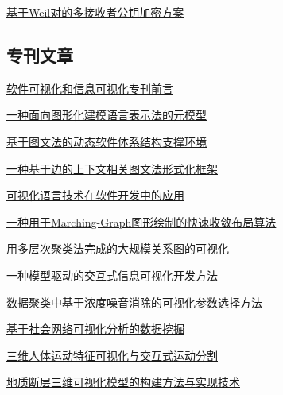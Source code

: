 \documentclass[a4paper]{article}
\begin{document}
\href{http://www.jos.org.cn/ch/reader/download_pdf.aspx?file_no=20080825&year_id=2008&quarter_id=8&falg=1}{基于Weil对的多接收者公钥加密方案}

\subsection{专刊文章}
\href{http://www.jos.org.cn/ch/reader/download_pdf.aspx?file_no=20080801&year_id=2008&quarter_id=8&falg=1}{软件可视化和信息可视化专刊前言}

\href{http://www.jos.org.cn/ch/reader/download_pdf.aspx?file_no=20080802&year_id=2008&quarter_id=8&falg=1}{一种面向图形化建模语言表示法的元模型}

\href{http://www.jos.org.cn/ch/reader/download_pdf.aspx?file_no=20080803&year_id=2008&quarter_id=8&falg=1}{基于图文法的动态软件体系结构支撑环境}

\href{http://www.jos.org.cn/ch/reader/download_pdf.aspx?file_no=20080804&year_id=2008&quarter_id=8&falg=1}{一种基于边的上下文相关图文法形式化框架}

\href{http://www.jos.org.cn/ch/reader/download_pdf.aspx?file_no=20080805&year_id=2008&quarter_id=8&falg=1}{可视化语言技术在软件开发中的应用}

\href{http://www.jos.org.cn/ch/reader/download_pdf.aspx?file_no=20080806&year_id=2008&quarter_id=8&falg=1}{一种用于Marching-Graph图形绘制的快速收敛布局算法}

\href{http://www.jos.org.cn/ch/reader/download_pdf.aspx?file_no=20080807&year_id=2008&quarter_id=8&falg=1}{用多层次聚类法完成的大规模关系图的可视化}

\href{http://www.jos.org.cn/ch/reader/download_pdf.aspx?file_no=20080808&year_id=2008&quarter_id=8&falg=1}{一种模型驱动的交互式信息可视化开发方法}

\href{http://www.jos.org.cn/ch/reader/download_pdf.aspx?file_no=20080809&year_id=2008&quarter_id=8&falg=1}{数据聚类中基于浓度噪音消除的可视化参数选择方法}

\href{http://www.jos.org.cn/ch/reader/download_pdf.aspx?file_no=20080810&year_id=2008&quarter_id=8&falg=1}{基于社会网络可视化分析的数据挖掘}

\href{http://www.jos.org.cn/ch/reader/download_pdf.aspx?file_no=20080811&year_id=2008&quarter_id=8&falg=1}{三维人体运动特征可视化与交互式运动分割}

\href{http://www.jos.org.cn/ch/reader/download_pdf.aspx?file_no=20080812&year_id=2008&quarter_id=8&falg=1}{地质断层三维可视化模型的构建方法与实现技术}
\end{document}
